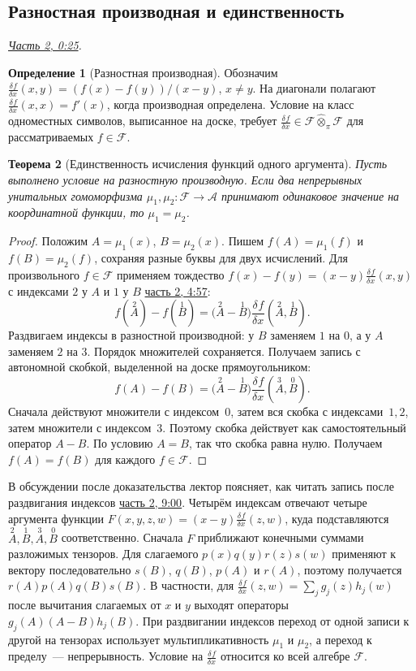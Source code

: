 \documentclass[11pt,a4paper]{article}
\theoremstyle{plain}
\newtheorem{theorem}{Теорема}[section]
\theoremstyle{definition}
\newtheorem{definition}[theorem]{Определение}
\newcommand{\ddiff}[2][]{\frac{\delta^{#1}#2}{\delta x^{#1}}}
\newcommand{\at}[3]{\href{https://www.youtube.com/watch?v=#1&t=#2s}{#3}}
\newcommand{\topic}[2]{\Needspace{5\baselineskip}\subsection*{#1}\noindent\emph{#2.}\par\nobreak\smallskip}
\begin{document}
\topic{Разностная производная и единственность}{\at{VzC1xw0kzKY}{25}{Часть 2, 0:25}}
\begin{definition}[Разностная производная]
Обозначим $\ddiff{f}(x,y)=(f(x)-f(y))/(x-y)$, $x\ne y$.
На диагонали полагают $\ddiff{f}(x,x)=f'(x)$, когда
производная определена. Условие на класс одноместных
символов, выписанное на доске, требует
$\ddiff{f}\in\mathcal F\widehat\otimes_\pi\mathcal F$
для рассматриваемых $f\in\mathcal F$.
\end{definition}
\begin{theorem}[Единственность исчисления функций одного аргумента]
Пусть выполнено условие на разностную производную.
Если два непрерывных унитальных гомоморфизма
$\mu_1,\mu_2:\mathcal F\to\mathcal A$ принимают одинаковое
значение на координатной функции, то $\mu_1=\mu_2$.
\end{theorem}
\begin{proof}
Положим $A=\mu_1(x)$, $B=\mu_2(x)$. Пишем
$f(A)=\mu_1(f)$ и $f(B)=\mu_2(f)$, сохраняя разные
буквы для двух исчислений. Для произвольного
$f\in\mathcal F$ применяем тождество
$f(x)-f(y)=(x-y)\ddiff{f}(x,y)$ с индексами $2$ у $A$
и $1$ у $B$ \at{VzC1xw0kzKY}{297}{часть 2, 4:57}:
\[
 f(\overset{2}{A})-f(\overset{1}{B})
 =\bigl(\overset{2}{A}-\overset{1}{B}\bigr)
      \ddiff{f}(\overset{2}{A},\overset{1}{B}).
\]
Раздвигаем индексы в разностной производной: у $B$
заменяем $1$ на $0$, а у $A$ заменяем $2$ на $3$.
Порядок множителей сохраняется. Получаем запись с
автономной скобкой, выделенной на доске прямоугольником:
\[
 f(A)-f(B)
 =\boxed{\bigl(\overset{2}{A}-\overset{1}{B}\bigr)}
      \ddiff{f}(\overset{3}{A},\overset{0}{B}).
\]
Сначала действуют множители с индексом~$0$, затем
вся скобка с индексами~$1,2$, затем множители с индексом~$3$.
Поэтому скобка
действует как самостоятельный оператор $A-B$.
По условию $A=B$, так что скобка равна нулю.
Получаем $f(A)=f(B)$ для каждого $f\in\mathcal F$.
\end{proof}

В обсуждении после доказательства лектор поясняет,
как читать запись после раздвигания индексов
\at{VzC1xw0kzKY}{540}{часть 2, 9:00}.
Четырём индексам отвечают четыре аргумента функции
$F(x,y,z,w)=(x-y)\ddiff{f}(z,w)$, куда подставляются
$\overset{2}{A},\overset{1}{B},\overset{3}{A},
\overset{0}{B}$ соответственно. Сначала $F$ приближают
конечными суммами разложимых тензоров. Для слагаемого
$p(x)q(y)r(z)s(w)$ применяют к вектору последовательно
$s(B)$, $q(B)$, $p(A)$ и $r(A)$, поэтому получается
$r(A)p(A)q(B)s(B)$. В частности, для
$\ddiff{f}(z,w)=\sum_j g_j(z)h_j(w)$ после вычитания
слагаемых от $x$ и $y$ выходят операторы
$g_j(A)(A-B)h_j(B)$. При раздвигании индексов переход
от одной записи к другой на тензорах использует
мультипликативность $\mu_1$ и $\mu_2$, а переход к
пределу~--- непрерывность. Условие на $\ddiff{f}$
относится ко всей алгебре $\mathcal F$.
\end{document}
